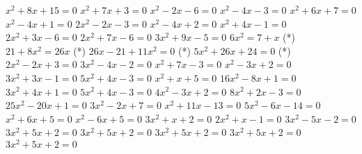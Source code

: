 \documentclass[twocolumns,12pt,addpoints,x11names]{exam}
\begin{document}
\begin{multicols}{2}
\begin{questions}
  \question $x^{2}+8x+15=0$
  \question $x^{2}+7x+3=0$
  \question $x^{2}-2x-6=0$
  \question $x^{2}-4x-3=0$
  \question $x^{2}+6x+7=0$
  \question $x^{2}-4x+1=0$
  \question $2x^{2}-2x-3=0$
  \question $x^{2}-4x+2=0$
  \question $x^{2}+4x-1=0$
  \question $2x^{2}+3x-6=0$
  \question $2x^{2}+7x-6=0$
  \question $3x^{2}+9x-5=0$
  \question $6x^2=7+x$ (*)
  \question $21+8x^2=26x$ (*)
  \question $26x-21+11x^2=0$ (*)
  \question $5x^2+26x+24=0$ (*)
  \question $2x^{2}-2x+3=0$
  \question $3x^{2}-4x-2=0$
  \question $x^{2}+7x-3=0$
  \question $x^{2}-3x+2=0$
  \question $3x^{2}+3x-1=0$
  \question $5x^{2}+4x-3=0$
  \question $x^{2}+x+5=0$
  \question $16x^{2}-8x+1=0$
  \question $3x^{2}+4x+1=0$
  \question $5x^{2}+4x-3=0$
  \question $4x^{2}-3x+2=0$
  \question $8x^{2}+2x-3=0$
  \question $25x^{2}-20x+1=0$
  \question $3x^{2}-2x+7=0$
  \question $x^{2}+11x-13=0$
  \question $5x^{2}-6x-14=0$
  \question $x^{2}+6x+5=0$
  \question $x^{2}-6x+5=0$
  \question $3x^{2}+x+2=0$
  \question $2x^{2}+x-1=0$
  \question $3x^{2}-5x-2=0$
  \question $3x^{2}+5x+2=0$
  \question $3x^{2}+5x+2=0$
  \question $3x^{2}+5x+2=0$
  \question $3x^{2}+5x+2=0$
  \question $3x^{2}+5x+2=0$
 













\end{questions}
\end{multicols}
\end{document}
